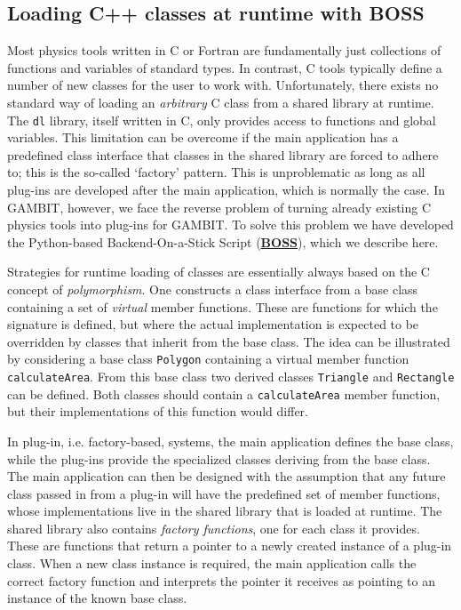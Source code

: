 \documentclass[pdftex,twocolumn,epjc3_preprint,runningheads]{svjour3}
\renewcommand{\_}{\discretionary{\underscore}{}{\underscore}}
\newcommand\cpp[1]{{\lstinline!#1!}}  %
\newcommand\term[1]{{\lstset{style=terminal}\lstinline!#1!\lstset{style=cpp}}}
\newcommand{\doublecrosssf}[2]{\hyperref[#2]{\textbf{\textsf{#1}}}}
\newcommand{\gambit}{\textsf{GAMBIT}\xspace}
\newcommand{\GB}{\gambit}
\newcommand\xx{\raisebox{0.2ex}{\smaller ++}\xspace}
\newcommand\Cpp{\textsf{C\xx}\xspace}
\newcommand\plainC{\textsf{C}\xspace}
\newcommand\Python{\textsf{Python}\xspace}
\newcommand\python{\Python}
\newcommand\Fortran{\textsf{Fortran}\xspace}
\begin{document}
\subsection{Loading \textsf{C{\smaller ++}} classes at runtime with BOSS}
\label{boss}

Most physics tools written in \plainC or \Fortran are fundamentally just collections of functions and variables of standard types. In contrast, \Cpp tools typically define a number of new classes for the user to work with. Unfortunately, there exists no standard way of loading an {\it arbitrary} \Cpp class from a shared library at runtime. The \term{dl} library, itself written in \plainC, only provides access to functions and global variables. This limitation can be overcome if the main application has a predefined class interface that classes in the shared library are forced to adhere to; this is the so-called `factory' pattern. This is unproblematic as long as all plug-ins are developed after the main application, which is normally the case. In \GB, however, we face the reverse problem of turning already existing \Cpp physics tools into plug-ins for \GB. To solve this problem we have developed the \python-based Backend-On-a-Stick Script (\doublecrosssf{BOSS}{BOSS}), which we describe here.

Strategies for runtime loading of classes are essentially always based on the \Cpp concept of {\it polymorphism}. One constructs a class interface from a base class containing a set of {\it virtual} member functions. These are functions for which the signature is defined, but where the actual implementation is expected to be overridden by classes that inherit from the base class. The idea can be illustrated by considering a base class \cpp{Polygon} containing a virtual member function \cpp{calculateArea}. From this base class two derived classes \cpp{Triangle} and \cpp{Rectangle} can be defined. Both classes should contain a \cpp{calculateArea} member function, but their implementations of this function would differ.

In plug-in, i.e. factory-based, systems, the main application defines the base class, while the plug-ins provide the specialized classes deriving from the base class. The main application can then be designed with the assumption that any future class passed in from a plug-in will have the predefined set of member functions, whose implementations live in the shared library that is loaded at runtime. The shared library also contains {\it factory functions}, one for each class it provides. These are functions that return a pointer to a newly created instance of a plug-in class. When a new class instance is required, the main application calls the correct factory function and interprets the pointer it receives as pointing to an instance of the known base class.
\end{document}
